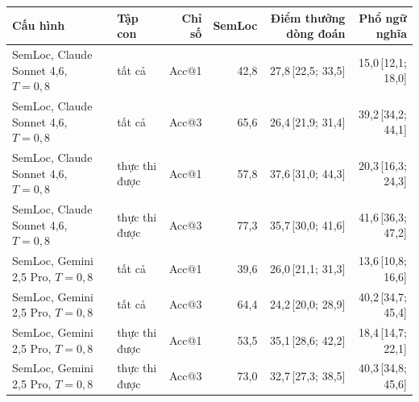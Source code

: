 \begin{tabular}{llrrrr}
\toprule
Cấu hình & Tập con & Chỉ số & SemLoc & Điểm thưởng dòng đoán & Phổ ngữ nghĩa \\
\midrule
SemLoc, Claude Sonnet 4,6, $T{=}0,8$ & tất cả & Acc@1 & 42,8 & 27,8{\scriptsize\,[22,5; 33,5]} & 15,0{\scriptsize\,[12,1; 18,0]} \\
SemLoc, Claude Sonnet 4,6, $T{=}0,8$ & tất cả & Acc@3 & 65,6 & 26,4{\scriptsize\,[21,9; 31,4]} & 39,2{\scriptsize\,[34,2; 44,1]} \\
SemLoc, Claude Sonnet 4,6, $T{=}0,8$ & thực thi được & Acc@1 & 57,8 & 37,6{\scriptsize\,[31,0; 44,3]} & 20,3{\scriptsize\,[16,3; 24,3]} \\
SemLoc, Claude Sonnet 4,6, $T{=}0,8$ & thực thi được & Acc@3 & 77,3 & 35,7{\scriptsize\,[30,0; 41,6]} & 41,6{\scriptsize\,[36,3; 47,2]} \\
SemLoc, Gemini 2,5 Pro, $T{=}0,8$ & tất cả & Acc@1 & 39,6 & 26,0{\scriptsize\,[21,1; 31,3]} & 13,6{\scriptsize\,[10,8; 16,6]} \\
SemLoc, Gemini 2,5 Pro, $T{=}0,8$ & tất cả & Acc@3 & 64,4 & 24,2{\scriptsize\,[20,0; 28,9]} & 40,2{\scriptsize\,[34,7; 45,4]} \\
SemLoc, Gemini 2,5 Pro, $T{=}0,8$ & thực thi được & Acc@1 & 53,5 & 35,1{\scriptsize\,[28,6; 42,2]} & 18,4{\scriptsize\,[14,7; 22,1]} \\
SemLoc, Gemini 2,5 Pro, $T{=}0,8$ & thực thi được & Acc@3 & 73,0 & 32,7{\scriptsize\,[27,3; 38,5]} & 40,3{\scriptsize\,[34,8; 45,6]} \\
\bottomrule
\end{tabular}
